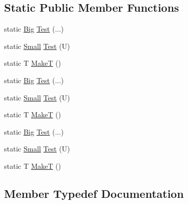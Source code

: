 \subsection*{Static Public Member Functions}
\begin{DoxyCompactItemize}
\item 
static \mbox{\hyperlink{structUtil_1_1Private_1_1ConversionHelper_1_1Big}{Big}} \mbox{\hyperlink{structUtil_1_1Private_1_1ConversionHelper_a70eb55dfb70dbf3459524083d35e350b}{Test}} (...)
\item 
static \mbox{\hyperlink{structUtil_1_1Private_1_1ConversionHelper_aaaf6583019b5246d4676b56923632385}{Small}} \mbox{\hyperlink{structUtil_1_1Private_1_1ConversionHelper_aeee49a75a44a57a9fec054caca088db9}{Test}} (U)
\item 
static T \mbox{\hyperlink{structUtil_1_1Private_1_1ConversionHelper_a5515ec18074242f117a5a1cf91ca3a7d}{MakeT}} ()
\item 
static \mbox{\hyperlink{structUtil_1_1Private_1_1ConversionHelper_1_1Big}{Big}} \mbox{\hyperlink{structUtil_1_1Private_1_1ConversionHelper_a70eb55dfb70dbf3459524083d35e350b}{Test}} (...)
\item 
static \mbox{\hyperlink{structUtil_1_1Private_1_1ConversionHelper_aaaf6583019b5246d4676b56923632385}{Small}} \mbox{\hyperlink{structUtil_1_1Private_1_1ConversionHelper_aeee49a75a44a57a9fec054caca088db9}{Test}} (U)
\item 
static T \mbox{\hyperlink{structUtil_1_1Private_1_1ConversionHelper_a5515ec18074242f117a5a1cf91ca3a7d}{MakeT}} ()
\item 
static \mbox{\hyperlink{structUtil_1_1Private_1_1ConversionHelper_1_1Big}{Big}} \mbox{\hyperlink{structUtil_1_1Private_1_1ConversionHelper_a70eb55dfb70dbf3459524083d35e350b}{Test}} (...)
\item 
static \mbox{\hyperlink{structUtil_1_1Private_1_1ConversionHelper_aaaf6583019b5246d4676b56923632385}{Small}} \mbox{\hyperlink{structUtil_1_1Private_1_1ConversionHelper_aeee49a75a44a57a9fec054caca088db9}{Test}} (U)
\item 
static T \mbox{\hyperlink{structUtil_1_1Private_1_1ConversionHelper_a5515ec18074242f117a5a1cf91ca3a7d}{MakeT}} ()
\end{DoxyCompactItemize}


\subsection{Member Typedef Documentation}
\mbox{\label{structUtil_1_1Private_1_1ConversionHelper_aaaf6583019b5246d4676b56923632385}} 
